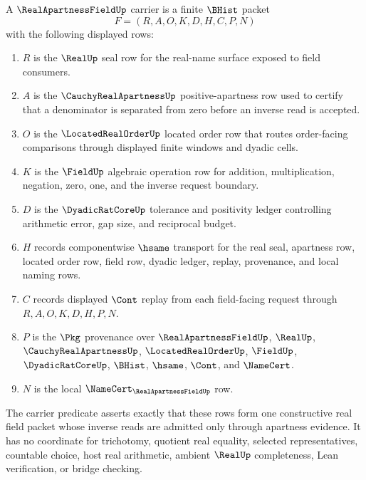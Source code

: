\begin{definition}
\label{def:real-apartness-field-carrier}
A $\RealApartnessFieldUp$ carrier is a finite $\BHist$ packet
$$
F=(R,A,O,K,D,H,C,P,N)
$$
with the following displayed rows:
\begin{enumerate}
\item $R$ is the $\RealUp$ seal row for the real-name surface exposed to field consumers.
\item $A$ is the $\CauchyRealApartnessUp$ positive-apartness row used to certify that a denominator is separated from zero before an inverse read is accepted.
\item $O$ is the $\LocatedRealOrderUp$ located order row that routes order-facing comparisons through displayed finite windows and dyadic cells.
\item $K$ is the $\FieldUp$ algebraic operation row for addition, multiplication, negation, zero, one, and the inverse request boundary.
\item $D$ is the $\DyadicRatCoreUp$ tolerance and positivity ledger controlling arithmetic error, gap size, and reciprocal budget.
\item $H$ records componentwise $\hsame$ transport for the real seal, apartness row, located order row, field row, dyadic ledger, replay, provenance, and local naming rows.
\item $C$ records displayed $\Cont$ replay from each field-facing request through $R,A,O,K,D,H,P,N$.
\item $P$ is the $\Pkg$ provenance over $\RealApartnessFieldUp$, $\RealUp$, $\CauchyRealApartnessUp$, $\LocatedRealOrderUp$, $\FieldUp$, $\DyadicRatCoreUp$, $\BHist$, $\hsame$, $\Cont$, and $\NameCert$.
\item $N$ is the local $\NameCert_{\RealApartnessFieldUp}$ row.
\end{enumerate}
The carrier predicate asserts exactly that these rows form one constructive real field packet whose inverse reads are admitted only through apartness evidence. It has no coordinate for trichotomy, quotient real equality, selected representatives, countable choice, host real arithmetic, ambient $\RealUp$ completeness, Lean verification, or bridge checking.
\end{definition}

